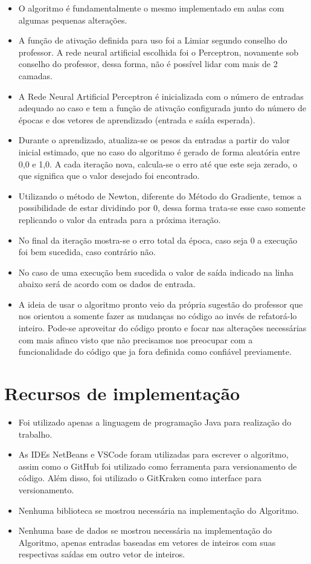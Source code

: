 \documentclass[12pt]{article}
\begin{document}
\begin{itemize}
    \item O algoritmo é fundamentalmente o mesmo implementado em aulas com algumas pequenas alterações. 
    \item A função de ativação definida para uso foi a Limiar segundo conselho do professor. A rede neural artificial escolhida foi o Perceptron, novamente sob conselho do professor, dessa forma, não é possível lidar com mais de 2 camadas.
    \item A Rede Neural Artificial Perceptron é inicializada com o número de entradas adequado ao caso e tem a função de ativação configurada junto do número de épocas e dos vetores de aprendizado (entrada e saída esperada).
    \item Durante o aprendizado, atualiza-se os pesos da entradas a partir do valor inicial estimado, que no caso do algoritmo é gerado de forma aleatória entre 0,0 e 1,0. A cada iteração nova, calcula-se o erro até que este seja zerado, o que significa que o valor desejado foi encontrado.
    \item Utilizando o método de Newton, diferente do Método do Gradiente, temos a possibilidade de estar dividindo por 0, dessa forma trata-se esse caso somente replicando o valor da entrada para a próxima iteração.
    \item No final da iteração mostra-se o erro total da época, caso seja 0 a execução foi bem sucedida, caso contrário não.
    \item No caso de uma execução bem sucedida o valor de saída indicado na linha abaixo será de acordo com os dados de entrada.
    \item A ideia de usar o algoritmo pronto veio da própria sugestão do professor que nos orientou a somente fazer as mudanças no código ao invés de refatorá-lo inteiro. Pode-se aproveitar do código pronto e focar nas alterações necessárias com mais afinco visto que não precisamos nos preocupar com a funcionalidade do código que ja fora definida como confiável previamente.
\end{itemize}

\section{Recursos de implementação}

\begin{itemize}
    \item Foi utilizado apenas a linguagem de programação Java para realização do trabalho.
    \item As IDEs NetBeans e VSCode foram utilizadas para escrever o algoritmo, assim como o GitHub foi utilizado como ferramenta para versionamento de código. Além disso, foi utilizado o GitKraken como interface para versionamento.
    \item Nenhuma biblioteca se mostrou necessária na implementação do Algoritmo.
    \item Nenhuma base de dados se mostrou necessária na implementação do Algoritmo, apenas entradas baseadas em vetores de inteiros com suas respectivas saídas em outro vetor de inteiros.
\end{itemize}
\end{document}
